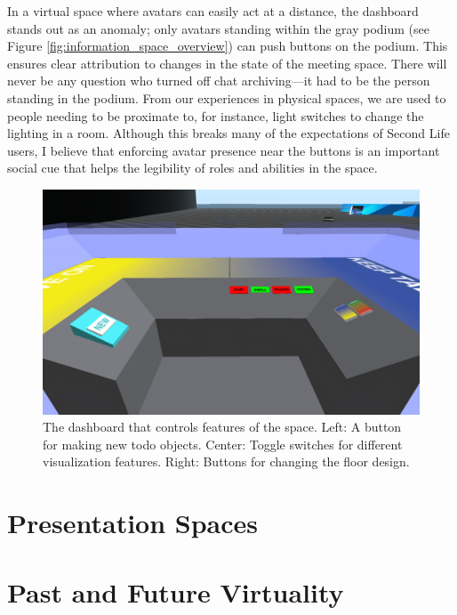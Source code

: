 In a virtual space where avatars can easily act at a distance, the dashboard stands out as an anomaly; only avatars standing within the gray podium (see Figure \ref{fig:information_space_overview}) can push buttons on the podium. This ensures clear attribution to changes in the state of the meeting space. There will never be any question who turned off chat archiving---it had to be the person standing in the podium. From our experiences in physical spaces, we are used to people needing to be proximate to, for instance, light switches to change the lighting in a room. Although this breaks many of the expectations of Second Life users, I believe that enforcing avatar presence near the buttons is an important social cue that helps the legibility of roles and abilities in the space. 

\begin{figure}[tp]
	\includegraphics{figures/dashboard.png}
	\caption{The dashboard that controls features of the space. Left: A button for making new todo objects. Center: Toggle switches for different visualization features. Right: Buttons for changing the floor design.}
	\label{fig:information_space_dashboard}
\end{figure}


\section{Presentation Spaces}


\section{Past and Future Virtuality}
